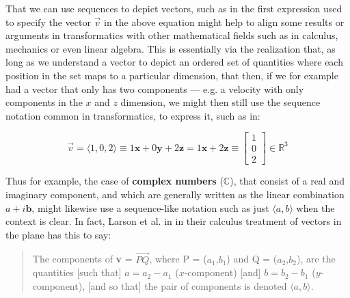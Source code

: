 \documentclass[a4paper, 18pt]{book} %
\begin{document}
\begin{appendices}
That we can use sequences to depict vectors, such as in the first expression used to specify the vector $\vec{v}$ in the above equation might help to align some results or arguments in transformatics with other mathematical fields such as in calculus, mechanics or even linear algebra. This is essentially via the realization that, as long as we understand a vector to depict an ordered set of quantities where each position in the set maps to a particular dimension, that then, if we for example had a vector that only has two components --- e.g. a velocity with only components in the $x$ and $z$ dimension, we might then still use the sequence notation common in transformatics, to express it, such as in:


\begin{equation}
\label{EQVECT2}
\vec{v} = \langle 1, 0, 2 \rangle \equiv 1\textbf{x} + 0\textbf{y} + 2\textbf{z} = 1\textbf{x} + 2\textbf{z} \equiv  \begin{bmatrix} 1 \\ 0 \\ 2 \end{bmatrix} \in \mathbb{R}^3
\end{equation}


\vspace{2em}

Thus for example, the case of \textbf{complex numbers} ($\mathbb{C}$), that consist of a real and imaginary component, and which are generally written as the linear combination $a + i\textbf{b}$, might likewise use a sequence-like notation such as just $\langle a, b\rangle$ when the context is clear. In fact, Larson et al. in \cite{ronlarsoncalculus} in their calculus treatment of vectors in the plane has this to say:


\noindent
\begin{minipage}{1\textwidth}
\vspace{1em}
\begin{quotation}
{\ttfamily

The components of \textbf{v} = $\overset{\rightarrow}{PQ}$, where P = ($a_1$,$b_1$) and Q = ($a_2$,$b_2$), are the quantities [such that] $a = a_2 - a_1$ ($x$-component) [and] $b = b_2 - b_1$ ($y$-component), [and so that] the pair of components is denoted $\langle a, b \rangle$.

}
\end{quotation}
\vspace{1em}
\end{minipage}

\vspace{2em}


\end{appendices}
\end{document}
